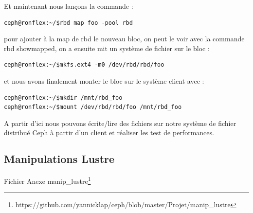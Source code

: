 \documentclass[12pt]{article}
\begin{document}
Et maintenant nous lançons la commande :
\begin{verbatim}
ceph@ronflex:~/$rbd map foo -pool rbd
\end{verbatim}

pour ajouter à la map de rbd le nouveau bloc, on peut le voir avec la commande rbd showmapped, on a ensuite mit un système de fichier sur le bloc :
\begin{verbatim}
ceph@ronflex:~/$mkfs.ext4 -m0 /dev/rbd/rbd/foo
\end{verbatim}

et nous avons finalement monter le bloc sur le système client avec :
\begin{verbatim}
ceph@ronflex:~/$mkdir /mnt/rbd_foo
ceph@ronflex:~/$mount /dev/rbd/rbd/foo /mnt/rbd_foo
\end{verbatim}

A partir d'ici nous pouvons écrite/lire des fichiers sur notre système de fichier distribué Ceph à partir d'un client et réaliser les test de performances.

\subsection{Manipulations Lustre}

Fichier Anexe manip\_lustre\footnote{https://github.com/yannicklap/ceph/blob/master/Projet/manip\_lustre}
\end{document}
